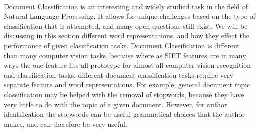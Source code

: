 \documentclass[paper=a4, fontsize=11pt]{scrartcl} %
\begin{document}
\paragraph{}
Document Classification is an interesting and widely studied task in the field of Natural Language Processing.  
It allows for unique challenges based on the type of classification that is attempted, and many open questions still exist.   
We will be discussing in this section different word representations, and how they effect the performance of given classification tasks.  
Document Classification is different than many computer vision tasks, because where as SIFT features are in many ways the one-feature-fits-all prototype for almost all computer vision recognition and classification tasks, different document classification tasks require very separate feature and word representations.  
For example, general document topic classification may be helped with the removal of stopwords, because they have very little to do with the topic of a given document.  
However, for author identification the stopwords can be useful grammatical choices that the author makes, and can therefore be very useful.  
\end{document}
